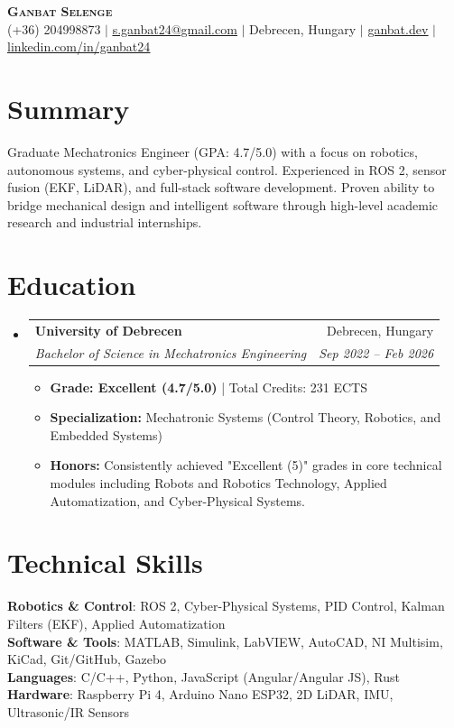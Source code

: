 \documentclass[letterpaper,11pt]{article}
\makeatletter
\newcommand{\resumeItem}[1]{
  \item\small{{#1 \vspace{-2pt}}}
}
\newcommand{\resumeSubheading}[4]{
  \vspace{-2pt}\item
    \begin{tabular*}{0.97\textwidth}[t]{l@{\extracolsep{\fill}}r}
      \textbf{#1} & #2 \\
      \textit{\small#3} & \textit{\small #4} \\
    \end{tabular*}\vspace{-7pt}
}
\newcommand{\resumeSubHeadingListStart}{\begin{itemize}[leftmargin=0.15in, label={}]}
\newcommand{\resumeSubHeadingListEnd}{\end{itemize}}
\newcommand{\resumeItemListStart}{\begin{itemize}}
\newcommand{\resumeItemListEnd}{\end{itemize}\vspace{-5pt}}
\makeatother
\begin{document}
\begin{center}
    \textbf{\Huge \scshape Ganbat Selenge} \\ \vspace{8pt}
    \small (+36) 204998873 $|$ 
    \href{mailto:s.ganbat24@gmail.com}{\underline{s.ganbat24@gmail.com}} $|$ 
    Debrecen, Hungary $|$
    \href{https://ganbat.dev/}{\underline{ganbat.dev}} $|$
    \href{https://www.linkedin.com/in/ganbat24/}{\underline{linkedin.com/in/ganbat24}}
\end{center}

\section{Summary}
Graduate Mechatronics Engineer (GPA: 4.7/5.0) with a focus on robotics, autonomous systems, and cyber-physical control. Experienced in ROS 2, sensor fusion (EKF, LiDAR), and full-stack software development. Proven ability to bridge mechanical design and intelligent software through high-level academic research and industrial internships.

\section{Education}
  \resumeSubHeadingListStart
    \resumeSubheading
      {University of Debrecen}{Debrecen, Hungary}
      {Bachelor of Science in Mechatronics Engineering}{Sep 2022 -- Feb 2026}
      \resumeItemListStart
        \resumeItem{\textbf{Grade: Excellent (4.7/5.0)} | Total Credits: 231 ECTS}
        \resumeItem{\textbf{Specialization:} Mechatronic Systems (Control Theory, Robotics, and Embedded Systems)}
        \resumeItem{\textbf{Honors:} Consistently achieved "Excellent (5)" grades in core technical modules including Robots and Robotics Technology, Applied Automatization, and Cyber-Physical Systems.}
      \resumeItemListEnd
  \resumeSubHeadingListEnd

\section{Technical Skills}
 \begin{itemize}[leftmargin=0.15in, label={}]
    \small{\item{
     \textbf{Robotics \& Control}{: ROS 2, Cyber-Physical Systems, PID Control, Kalman Filters (EKF), Applied Automatization} \\
     \textbf{Software \& Tools}{: MATLAB, Simulink, LabVIEW, AutoCAD, NI Multisim, KiCad, Git/GitHub, Gazebo} \\
     \textbf{Languages}{: C/C++, Python, JavaScript (Angular/Angular JS), Rust} \\
     \textbf{Hardware}{: Raspberry Pi 4, Arduino Nano ESP32, 2D LiDAR, IMU, Ultrasonic/IR Sensors}
    }}
 \end{itemize}
\end{document}

